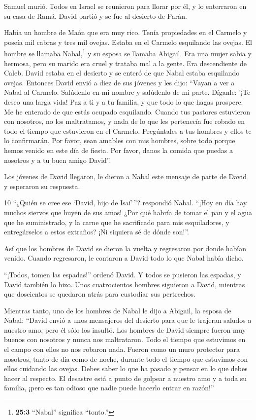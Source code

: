  Samuel murió. Todos en Israel se reunieron para llorar por
él, y lo enterraron en su casa de Ramá. David partió y se fue al
desierto de Parán.

 Había un hombre de Maón que era muy rico. Tenía propiedades
en el Carmelo y poseía mil cabras y tres mil ovejas. Estaba en el
Carmelo esquilando las ovejas.  El hombre se llamaba
Nabal,\footnote{\textbf{25:3} ``Nabal'' significa ``tonto.''} y su
esposa se llamaba Abigail. Era una mujer sabia y hermosa, pero su marido
era cruel y trataba mal a la gente. Era descendiente de Caleb.
 David estaba en el desierto y se enteró de que Nabal estaba
esquilando ovejas.  Entonces David envió a diez de sus
jóvenes y les dijo: ``Vayan a ver a Nabal al Carmelo. Salúdenlo en mi
nombre y salúdenlo de mi parte.  Díganle: '¡Te deseo una
larga vida! Paz a ti y a tu familia, y que todo lo que hagas prospere.
 Me he enterado de que estás ocupado esquilando. Cuando tus
pastores estuvieron con nosotros, no los maltratamos, y nada de lo que
les pertenecía fue robado en todo el tiempo que estuvieron en el
Carmelo.  Pregúntales a tus hombres y ellos te lo
confirmarán. Por favor, sean amables con mis hombres, sobre todo porque
hemos venido en este día de fiesta. Por favor, danos la comida que
puedas a nosotros y a tu buen amigo David''.

 Los jóvenes de David llegaron, le dieron a Nabal este
mensaje de parte de David y esperaron su respuesta.

10 ``¿Quién se cree ese `David, hijo de Isaí'\,''? respondió Nabal.
``¡Hoy en día hay muchos siervos que huyen de sus amos! 
¿Por qué habría de tomar el pan y el agua que he suministrado, y la
carne que he sacrificado para mis esquiladores, y entregárselos a estos
extraños? ¡Ni siquiera sé de dónde son!''.

 Así que los hombres de David se dieron la vuelta y
regresaron por donde habían venido. Cuando regresaron, le contaron a
David todo lo que Nabal había dicho.

 ``¡Todos, tomen las espadas!'' ordenó David. Y todos se
pusieron las espadas, y David también lo hizo. Unos cuatrocientos
hombres siguieron a David, mientras que doscientos se quedaron atrás
para custodiar sus pertrechos.

 Mientras tanto, uno de los hombres de Nabal le dijo a
Abigail, la esposa de Nabal: ``David envió a unos mensajeros del
desierto para que le trajeran saludos a nuestro amo, pero él sólo los
insultó.  Los hombres de David siempre fueron muy buenos
con nosotros y nunca nos maltrataron. Todo el tiempo que estuvimos en el
campo con ellos no nos robaron nada.  Fueron como un muro
protector para nosotros, tanto de día como de noche, durante todo el
tiempo que estuvimos con ellos cuidando las ovejas.  Debes
saber lo que ha pasado y pensar en lo que debes hacer al respecto. El
desastre está a punto de golpear a nuestro amo y a toda su familia,
¡pero es tan odioso que nadie puede hacerlo entrar en razón!''

